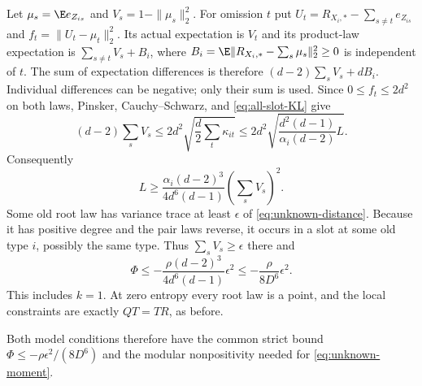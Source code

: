 Let $\mu_s=\E e_{Z_{is}}$ and $V_s=1-\|\mu_s\|_2^2$.
For omission $t$ put
$U_t=R_{X_i,*}-\sum_{s\ne t}e_{Z_{is}}$ and
$f_t=\|U_t-\mu_t\|_2^2$.
Its actual expectation is $V_t$ and its product-law expectation is
$\sum_{s\ne t}V_s+B_i$, where
$B_i=\E\|R_{X_i,*}-\sum_s\mu_s\|_2^2\ge0$ is independent of $t$.
The sum of expectation differences is therefore
$(d-2)\sum_sV_s+dB_i$. Individual differences can be negative;
only their sum is used. Since $0\le f_t\le2d^2$ on both laws,
Pinsker, Cauchy--Schwarz, and \eqref{eq:all-slot-KL} give
\[
 (d-2)\sum_sV_s
 \le2d^2\sqrt{\frac d2\sum_t\kappa_{it}}
 \le2d^2\sqrt{\frac{d^2(d-1)}{\alpha_i(d-2)}L}.
\]
Consequently
\begin{equation}\label{eq:all-slot-local-gap}
 L\ge\frac{\alpha_i(d-2)^3}{4d^6(d-1)}
                      \left(\sum_sV_s\right)^2.
\end{equation}
Some old root law has variance trace at least $\epsilon$ of
\eqref{eq:unknown-distance}. Because it has positive degree and
the pair laws reverse, it occurs in a slot at some old type $i$,
possibly the same type. Thus $\sum_sV_s\ge\epsilon$ there and
\begin{equation}\label{eq:all-slot-gap}
 \Phi\le-\frac{\rho(d-2)^3}{4d^6(d-1)}\epsilon^2
       \le-\frac{\rho}{8D^6}\epsilon^2.
\end{equation}
This includes $k=1$. At zero entropy every root law is a point,
and the local constraints are exactly $QT=TR$, as before.

Both model conditions therefore have the common strict bound
$\Phi\le-\rho\epsilon^2/(8D^6)$ and the modular nonpositivity
needed for \eqref{eq:unknown-moment}.
